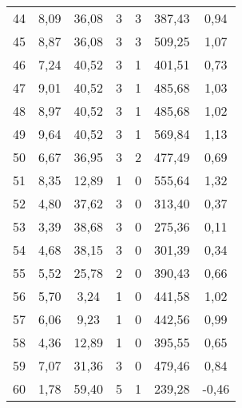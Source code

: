 \begin{table}[h]
\begin{tabular}{c|ccccc|c}
44               & 8,09             & 36,08         & 3            & 3              & 387,43      & 0,94            \\
45               & 8,87             & 36,08         & 3            & 3              & 509,25      & 1,07            \\
46               & 7,24             & 40,52         & 3            & 1              & 401,51      & 0,73            \\
47               & 9,01             & 40,52         & 3            & 1              & 485,68      & 1,03            \\
48               & 8,97             & 40,52         & 3            & 1              & 485,68      & 1,02            \\
49               & 9,64             & 40,52         & 3            & 1              & 569,84      & 1,13            \\
50               & 6,67             & 36,95         & 3            & 2              & 477,49      & 0,69            \\
51               & 8,35             & 12,89         & 1            & 0              & 555,64      & 1,32            \\
52               & 4,80             & 37,62         & 3            & 0              & 313,40      & 0,37            \\
53               & 3,39             & 38,68         & 3            & 0              & 275,36      & 0,11            \\
54               & 4,68             & 38,15         & 3            & 0              & 301,39      & 0,34            \\
55               & 5,52             & 25,78         & 2            & 0              & 390,43      & 0,66            \\
56               & 5,70             & 3,24          & 1            & 0              & 441,58      & 1,02            \\
57               & 6,06             & 9,23          & 1            & 0              & 442,56      & 0,99            \\
58               & 4,36             & 12,89         & 1            & 0              & 395,55      & 0,65            \\
59               & 7,07             & 31,36         & 3            & 0              & 479,46      & 0,84            \\
60               & 1,78             & 59,40         & 5            & 1              & 239,28      & -0,46           \\

\end{tabular}
\end{table}
